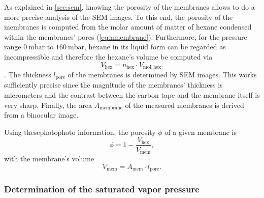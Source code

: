 \documentclass[../thesis.tex]{subfiles}
\begin{document}
        As explained in \cref{sec:sem}, knowing the porosity of the membranes allows to do a more precise analysis of the SEM images. To this end, the porosity of the membranes is computed from the molar amount of matter of hexane condensed within the membranes' pores (\cref{eq:nmembrane}). Furthermore, for the pressure range $\SI{0}{\milli\bar}$ to $\SI{160}{\milli\bar}$, hexane in its liquid form can be regarded as incompressible and therefore the hexane's volume be computed via
        \begin{equation*}
            V_\mathrm{hex} = n_\mathrm{hex} \cdot V_\mathrm{mol, hex}.
        \end{equation*}.
        The thickness $l_\mathrm{pore}$ of the membranes is determined by SEM images. This works sufficiently precise since the magnitude of the membranes' thickness is micrometers and the contrast between the carbon tape and the membrane itself is very sharp. Finally, the area $A_\mathrm{membrane}$ of the measured membranes is derived from a binocular image.

        Using thesephotophoto information, the porosity $\phi$ of a given membrane is
        \begin{equation*}
            \phi = 1 - \frac{V_\mathrm{hex}}{V_\mathrm{mem}} ,
            \label{eq:porosity}
        \end{equation*}
        with the membrane's volume
        \begin{equation*}
            V_\mathrm{mem} = A_\mathrm{mem} \cdot l_\mathrm{pore}.
        \end{equation*}


      \subsubsection{Determination of the saturated vapor pressure}
      \label{sssec:determination-sat-vapor-pressure}
\end{document}
